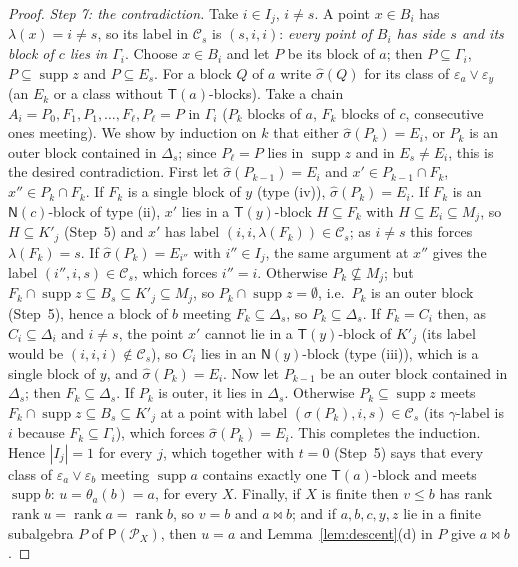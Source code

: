 \documentclass[11pt]{amsart}
\theoremstyle{definition}
\renewcommand{\P}{\mathcal{P}}      %
\newcommand{\PA}{\mathsf{P}}         %
\newcommand{\supp}{\operatorname{supp}}
\newcommand{\T}{\mathsf{T}}
\newcommand{\N}{\mathsf{N}}
\newcommand{\rk}{\operatorname{rank}}
\newcommand{\mt}{\bowtie}      %
\begin{document}
\begin{proof}
\smallskip\emph{Step 7: the contradiction.} Take $i\in I_j$, $i\ne s$. A point $x\in B_i$ has $\lambda(x)=i\ne s$, so its label in $\mathcal C_s$ is $(s,i,i)$: \emph{every point of $B_i$ has side $s$ and its block of $c$ lies in $\Gamma_i$}. Choose $x\in B_i$ and let $P$ be its block of $a$; then $P\subseteq\Gamma_i$, $P\subseteq\supp z$ and $P\subseteq E_s$. For a block $Q$ of $a$ write $\hat\sigma(Q)$ for its class of $\varepsilon_a\vee\varepsilon_y$ (an $E_k$ or a class without $\T(a)$-blocks). Take a chain $A_i=P_0,F_1,P_1,\dots,F_\ell,P_\ell=P$ in $\Gamma_i$ ($P_k$ blocks of $a$, $F_k$ blocks of $c$, consecutive ones meeting). We show by induction on $k$ that either $\hat\sigma(P_k)=E_i$, or $P_k$ is an outer block contained in $\Delta_s$; since $P_\ell=P$ lies in $\supp z$ and in $E_s\ne E_i$, this is the desired contradiction. First let $\hat\sigma(P_{k-1})=E_i$ and $x'\in P_{k-1}\cap F_k$, $x''\in P_k\cap F_k$. If $F_k$ is a single block of $y$ (type (iv)), $\hat\sigma(P_k)=E_i$. If $F_k$ is an $\N(c)$-block of type (ii), $x'$ lies in a $\T(y)$-block $H\subseteq F_k$ with $H\subseteq E_i\subseteq M_j$, so $H\subseteq K'_j$ (Step~5) and $x'$ has label $(i,i,\lambda(F_k))\in\mathcal C_s$; as $i\ne s$ this forces $\lambda(F_k)=s$. If $\hat\sigma(P_k)=E_{i''}$ with $i''\in I_j$, the same argument at $x''$ gives the label $(i'',i,s)\in\mathcal C_s$, which forces $i''=i$. Otherwise $P_k\not\subseteq M_j$; but $F_k\cap\supp z\subseteq B_s\subseteq K'_j\subseteq M_j$, so $P_k\cap\supp z=\emptyset$, i.e.\ $P_k$ is an outer block (Step~5), hence a block of $b$ meeting $F_k\subseteq\Delta_s$, so $P_k\subseteq\Delta_s$. If $F_k=C_i$ then, as $C_i\subseteq\Delta_i$ and $i\ne s$, the point $x'$ cannot lie in a $\T(y)$-block of $K'_j$ (its label would be $(i,i,i)\notin\mathcal C_s$), so $C_i$ lies in an $\N(y)$-block (type (iii)), which is a single block of $y$, and $\hat\sigma(P_k)=E_i$. Now let $P_{k-1}$ be an outer block contained in $\Delta_s$; then $F_k\subseteq\Delta_s$. If $P_k$ is outer, it lies in $\Delta_s$. Otherwise $P_k\subseteq\supp z$ meets $F_k\cap\supp z\subseteq B_s\subseteq K'_j$ at a point with label $(\hat\sigma(P_k),i,s)\in\mathcal C_s$ (its $\gamma$-label is $i$ because $F_k\subseteq\Gamma_i$), which forces $\hat\sigma(P_k)=E_i$. This completes the induction. Hence $|I_j|=1$ for every $j$, which together with $t=0$ (Step~5) says that every class of $\varepsilon_a\vee\varepsilon_b$ meeting $\supp a$ contains exactly one $\T(a)$-block and meets $\supp b$: $u=\theta_a(b)=a$, for every $X$. Finally, if $X$ is finite then $v\le b$ has rank $\rk u=\rk a=\rk b$, so $v=b$ and $a\mt b$; and if $a,b,c,y,z$ lie in a finite subalgebra $P$ of $\PA(\P_X)$, then $u=a$ and Lemma~\ref{lem:descent}(d) in $P$ give $a\mt b$.
\end{proof}
\end{document}
